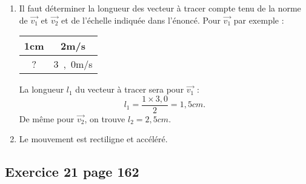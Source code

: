 \documentclass[12pt,a4paper,fleqn]{article}
\begin{document}
\begin{enumerate}
\item Il faut déterminer la longueur des vecteur à tracer compte tenu de la norme de $\vec{v_1}$ et $\vec{v_2}$ et de l'échelle indiquée dans l'énoncé. Pour $\vec{v_1}$ par exemple :
\begin{center}
\begin{tabular}{c|c}
\unit{1}{cm} & \unit{2}{m/s} \\
\hline
? & \unit{3{,}0}{m/s}
\end{tabular}
\end{center}
La longueur $l_1$ du vecteur à tracer sera pour $\vec{v_1}$ :
\[
l_1 = \frac{1\times 3{,}0}{2} = \unit{1{,}5}{cm}.
\]
De même pour $\vec{v_2}$, on trouve $l_2 = \unit{2{,}5}{cm}$.

\begin{center}
\end{center}

\item Le mouvement est rectiligne et accéléré.
\end{enumerate}

\subsection*{Exercice 21 page 162}
\end{document}
